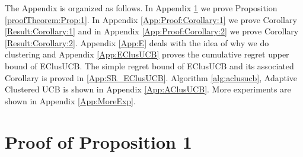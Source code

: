 
\appendix
The Appendix is organized as follows. In Appendix \ref{App:A} we prove Proposition \ref{proofTheorem:Prop:1}. In Appendix \ref{App:Proof:Corollary:1} we prove Corollary \ref{Result:Corollary:1} and in Appendix \ref{App:Proof:Corollary:2} we prove Corollary \ref{Result:Corollary:2}. Appendix \ref{App:E} deals with the idea of why we do clustering and Appendix \ref{App:EClusUCB} proves the cumulative regret upper bound of EClusUCB. The simple regret bound of EClusUCB and its associated Corollary is proved in \ref{App:SR_EClusUCB}. Algorithm \ref{alg:aclusucb}, Adaptive Clustered UCB is shown in Appendix \ref{App:AClusUCB}. More experiments are shown in Appendix \ref{App:MoreExp}.



\section{Proof of Proposition 1}
\label{App:A}

